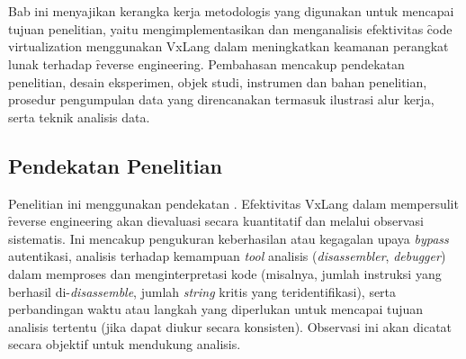 \chapter{\babTiga}
Bab ini menyajikan kerangka kerja metodologis yang digunakan untuk mencapai tujuan penelitian, yaitu mengimplementasikan dan menganalisis efektivitas \f{code virtualization} menggunakan VxLang dalam meningkatkan keamanan perangkat lunak terhadap \f{reverse engineering}. Pembahasan mencakup pendekatan penelitian, desain eksperimen, objek studi, instrumen dan bahan penelitian, prosedur pengumpulan data yang direncanakan termasuk ilustrasi alur kerja, serta teknik analisis data.

\section{Pendekatan Penelitian}
Penelitian ini menggunakan pendekatan . Efektivitas VxLang dalam mempersulit \f{reverse engineering} akan dievaluasi secara kuantitatif dan melalui observasi sistematis. Ini mencakup pengukuran keberhasilan atau kegagalan upaya \textit{bypass} autentikasi, analisis terhadap kemampuan \textit{tool} analisis (\textit{disassembler}, \textit{debugger}) dalam memproses dan menginterpretasi kode (misalnya, jumlah instruksi yang berhasil di-\textit{disassemble}, jumlah \textit{string} kritis yang teridentifikasi), serta perbandingan waktu atau langkah yang diperlukan untuk mencapai tujuan analisis tertentu (jika dapat diukur secara konsisten). Observasi ini akan dicatat secara objektif untuk mendukung analisis.

